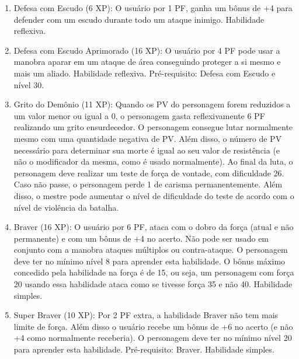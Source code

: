 \begin{enumerate}
	\item Defesa com Escudo (6 XP): O usuário por 1 PF, ganha um bônus de +4 para defender com um escudo durante todo um ataque inimigo. Habilidade reflexiva.
	
	\item Defesa com Escudo Aprimorado (16 XP): O usuário por 4 PF pode usar a manobra aparar em um ataque de área conseguindo proteger a si mesmo e mais um aliado. Habilidade reflexiva. Pré-requisito: Defesa com Escudo e nível 30.
	

	\item Grito do Demônio (11 XP): Quando os PV do personagem forem reduzidos a um valor menor ou igual a 0, o personagem gasta reflexivamente 6 PF realizando um grito ensurdecedor. O personagem consegue lutar normalmente mesmo com uma quantidade negativa de PV. Além disso, o número de PV necessário para determinar sua morte é igual ao seu valor de resistência (e não o modificador da mesma, como é usado normalmente). Ao final da luta, o personagem deve realizar um teste de força de vontade, com dificuldade 26. Caso não passe, o personagem perde 1 de carisma permanentemente. Além disso, o mestre pode aumentar o nível de dificuldade do teste de acordo com o nível de violência da batalha.


	\item Braver (16 XP): O usuário por 6 PF, ataca com o dobro da força (atual e não permanente) e com um bônus de +4 no acerto. Não pode ser usado em conjunto com a manobra ataques múltiplos ou contra-ataque. O personagem deve ter no mínimo nível 8 para aprender esta habilidade. O bônus máximo concedido pela habilidade na força é de 15, ou seja, um personagem com força 20 usando essa habilidade ataca como se tivesse força 35 e não 40. Habilidade simples.

	\item Super Braver (10 XP): Por 2 PF extra, a habilidade Braver não tem mais limite de força. Além disso o usuário recebe um bônus de +6 no acerto (e não +4 como normalmente receberia). O personagem deve ter no mínimo nível 20 para aprender esta habilidade. Pré-requisito: Braver. Habilidade simples.


\end{enumerate}

